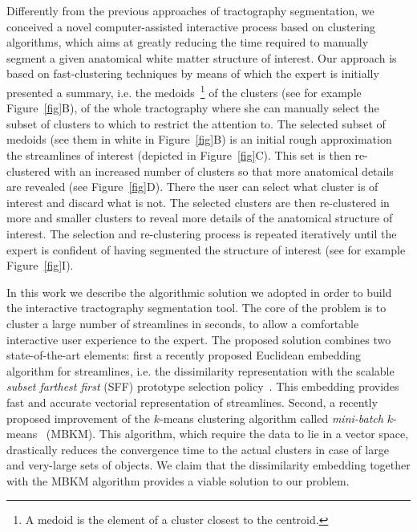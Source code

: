 Differently from the previous approaches of tractography segmentation,
we conceived a novel computer-assisted interactive process based on
clustering algorithms, which aims at greatly reducing the time
required to manually segment a given anatomical white matter structure
of interest. Our approach is based on fast-clustering techniques by
means of which the expert is initially presented a summary, i.e. the
medoids~\footnote{A medoid is the element of a cluster closest to the
  centroid.} of the clusters (see for example Figure~\ref{fig}B), of
the whole tractography where she can manually select the subset of
clusters to which to restrict the attention to. The selected subset of
medoids (see them in white in Figure~\ref{fig}B) is an initial rough
approximation the streamlines of interest (depicted in
Figure~\ref{fig}C). This set is then re-clustered with an increased
number of clusters so that more anatomical details are revealed (see
Figure~\ref{fig}D). There the user can select what cluster is of
interest and discard what is not. The selected clusters are then
re-clustered in more and smaller clusters to reveal more details of
the anatomical structure of interest. The selection and re-clustering
process is repeated iteratively until the expert is confident of
having segmented the structure of interest (see for example
Figure~\ref{fig}I).

In this work we describe the algorithmic solution we adopted in order
to build the interactive tractography segmentation tool. The core of
the problem is to cluster a large number of streamlines in seconds, to
allow a comfortable interactive user experience to the expert. The
proposed solution combines two state-of-the-art elements: first a
recently proposed Euclidean embedding algorithm for streamlines,
i.e. the dissimilarity representation with the scalable \emph{subset
  farthest first} (SFF) prototype selection
policy~\cite{olivetti2012approximation}. This embedding provides fast
and accurate vectorial representation of streamlines. Second, a
recently proposed improvement of the $k$-means clustering algorithm
called \emph{mini-batch} $k$-means~\cite{sculley2010web} (MBKM). This
algorithm, which require the data to lie in a vector space,
drastically reduces the convergence time to the actual clusters in
case of large and very-large sets of objects. We claim that the
dissimilarity embedding together with the MBKM algorithm provides a
viable solution to our problem.


